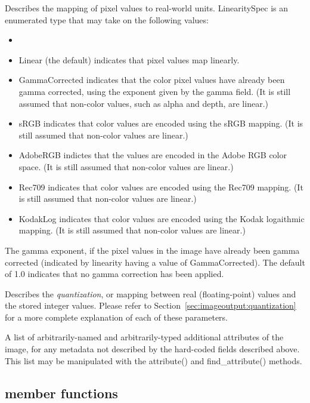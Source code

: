 Describes the mapping of pixel values to real-world units.  
{\cf LinearitySpec} is
an enumerated type that may take on the following values:
\begin{itemize}
\item[] 
\item {\cf Linear} (the default) indicates that pixel values map
  linearly.
\item {\cf GammaCorrected} indicates that the color pixel values have
  already been gamma corrected, using the exponent given by the {\cf
    gamma} field.  (It is still assumed that non-color values, such as
  alpha and depth, are linear.)
\item {\cf sRGB} indicates that color values are encoded using the sRGB
  mapping.  (It is still assumed that non-color values are linear.)
\item {\cf AdobeRGB} indictes that the values are encoded in the
Adobe RGB color space. (It is still assumed that non-color values are linear.)
\item {\cf Rec709} indicates that color values are encoded using the 
  Rec709 mapping.  (It is still assumed that non-color values are linear.)
\item {\cf KodakLog} indicates that color values are encoded using the 
  Kodak logaithmic mapping.  (It is still assumed that non-color values are linear.)
\end{itemize}
\apiend

The gamma exponent, if the pixel values in the image have already been
gamma corrected (indicated by {\cf linearity} having a value of {\cf
GammaCorrected}).  The default of 1.0 indicates that no gamma
correction has been applied.
\apiend

Describes the \emph{quantization}, or mapping between real
(floating-point) values and the stored integer values.
Please refer to Section~\ref{sec:imageoutput:quantization} for
a more complete explanation of each of these parameters.
\apiend

A list of arbitrarily-named and arbitrarily-typed additional attributes
of the image, for any metadata not described by the hard-coded fields
described above.  This list may be manipulated with the {\cf
attribute()} and {\cf find_attribute()} methods.
\apiend

\subsection{\ImageSpec member functions}

